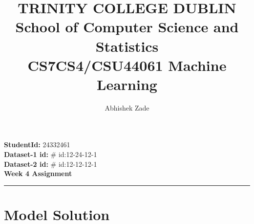 \documentclass[a4paper,10pt]{article}
\begin{document}
\vspace{-2cm}
\title{\LARGE \textbf{TRINITY COLLEGE DUBLIN} \\ %
\large School of Computer Science and Statistics \\
\small \textbf{CS7CS4/CSU44061 Machine Learning}}
\author{Abhishek Zade}
\date{} %
\maketitle
\vspace{-1cm} %

\noindent
\textbf{StudentId:} 24332461 \\
\textbf{Dataset-1 id:} \# id:12-24-12-1 \\
\textbf{Dataset-2 id:} \# id:12-12-12-1 \\
\textbf{Week 4 Assignment} \\

\noindent\rule{\textwidth}{0.4pt} %

\section*{Model Solution}
\end{document}
